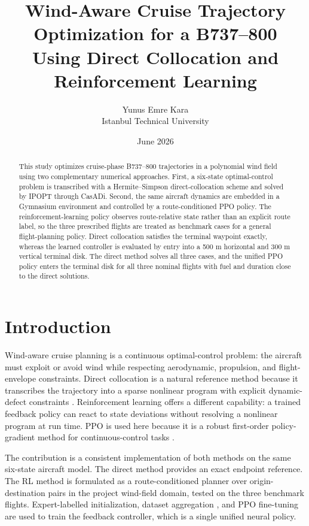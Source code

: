 \documentclass[11pt,a4paper]{article}
\title{Wind-Aware Cruise Trajectory Optimization for a B737--800\\
Using Direct Collocation and Reinforcement Learning}
\author{Yunus Emre Kara\\\small Istanbul Technical University}
\date{June 2026}
\begin{document}
\maketitle

\begin{abstract}
This study optimizes cruise-phase B737--800 trajectories in a
polynomial wind field using two complementary numerical approaches.
First, a six-state optimal-control problem is transcribed with a
Hermite--Simpson direct-collocation scheme and solved by IPOPT through
CasADi. Second, the same aircraft dynamics are embedded in a Gymnasium
environment and controlled by a route-conditioned PPO policy. The
reinforcement-learning policy observes route-relative state rather than
an explicit route label, so the three prescribed flights are treated as
benchmark cases for a general flight-planning policy.
Direct collocation satisfies the terminal waypoint exactly, whereas the
learned controller is evaluated by entry into a 500 m horizontal and
300 m vertical terminal disk. The direct method solves all three cases,
and the unified PPO policy enters the terminal disk for all three
nominal flights with fuel and duration close to the direct solutions.
\end{abstract}

\section{Introduction}
Wind-aware cruise planning is a continuous optimal-control problem: the
aircraft must exploit or avoid wind while respecting aerodynamic,
propulsion, and flight-envelope constraints. Direct collocation is a
natural reference method because it transcribes the trajectory into a
sparse nonlinear program with explicit dynamic-defect constraints
\cite{betts,casadi,ipopt}. Reinforcement learning offers a different
capability: a trained feedback policy can react to state deviations
without resolving a nonlinear program at run time. PPO is used here
because it is a robust first-order policy-gradient method for
continuous-control tasks \cite{ppo,sb3,gymnasium}.

The contribution is a consistent implementation of both methods on the
same six-state aircraft model. The direct method provides an exact
endpoint reference. The RL method is formulated as a route-conditioned
planner over origin-destination pairs in the project wind-field domain,
tested on the three benchmark flights. Expert-labelled initialization,
dataset aggregation \cite{dagger}, and PPO fine-tuning are used to train
the feedback controller, which is a single unified neural policy.
\end{document}

